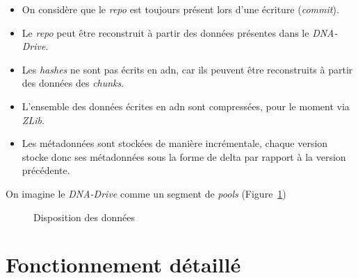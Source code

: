 \documentclass[a4paper]{report}
\begin{document}
\begin{itemize}
\item
  On considère que le \emph{repo} est toujours présent lors d'une
  écriture (\emph{commit}).
\item
  Le \emph{repo} peut être reconstruit à partir des données présentes
  dans le \emph{DNA-Drive}.
\item
  Les \emph{hashes} ne sont pas écrits en \ac{adn}, car ils peuvent être
  reconstruits à partir des données des \emph{chunks}.
\item
  L'ensemble des données écrites en \ac{adn} sont compressées, pour le moment
  via \emph{ZLib}.
\item
  Les métadonnées sont stockées de manière incrémentale, chaque version
  stocke donc ses métadonnées sous la forme de delta par rapport à la
  version précédente.
\end{itemize}

On imagine le \emph{DNA-Drive} comme un segment de \emph{pools} (Figure~\ref{fig:data-layout})

\begin{figure}[ht]
\centering


\caption{Disposition des données}
\label{fig:data-layout}
\end{figure}


\chapter{Fonctionnement détaillé}
\end{document}
